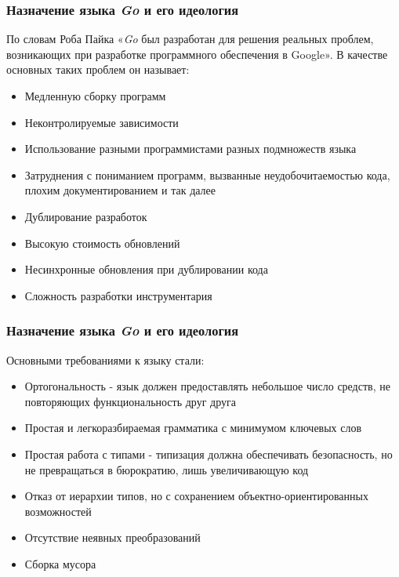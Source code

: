 \documentclass[11pt]{beamer}
\begin{document}
\begin{frame}
\frametitle{Назначение языка \textit{Go} и его идеология}
По словам Роба Пайка «\textit{Go} был разработан для решения реальных проблем, возникающих при разработке программного обеспечения в Google». В качестве основных таких проблем он называет:
\begin{itemize} 
    \item Медленную сборку программ
    \item Неконтролируемые зависимости
    \item Использование разными программистами разных подмножеств языка
    \item Затруднения с пониманием программ, вызванные неудобочитаемостью кода, плохим документированием и так далее
    \item Дублирование разработок
    \item Высокую стоимость обновлений
    \item Несинхронные обновления при дублировании кода
    \item Сложность разработки инструментария
\end{itemize}
\end{frame}
\begin{frame}
\frametitle{Назначение языка \textit{Go} и его идеология}
Основными требованиями к языку стали:
\begin{itemize} 
    \item Ортогональность - язык должен предоставлять небольшое число средств, не повторяющих функциональность друг друга
    \item Простая и легкоразбираемая грамматика с минимумом ключевых слов
    \item Простая работа с типами - типизация должна обеспечивать безопасность, но не превращаться в бюрократию, лишь увеличивающую код
    \item Отказ от иерархии типов, но с сохранением объектно-ориентированных возможностей
    \item Отсутствие неявных преобразований
    \item {\color{green}Сборка мусора}
\end{itemize}
\end{frame}
\end{document}
